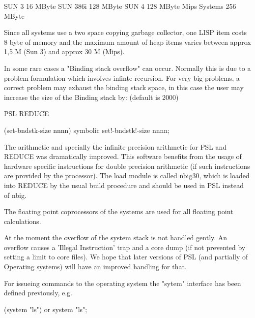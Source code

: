 \begin{enumerate}
{




         SUN 3               16 MByte
         SUN 386i           128 MByte
         SUN 4              128 MByte 
         Mips Systems       256 MByte

Since all systems use a two space copying garbage collector, one LISP 
item costs 8 byte of memory and the maximum amount of heap items varies 
between approx 1,5 M (Sun 3) and approx 30 M (Mips).   


In some rare cases a "Binding stack overflow" can occur. 
Normally this is due to a problem formulation which involves infinte
recursion. For very big problems, a correct problem may exhaust the binding
stack space, in this case the user may increase the size of the 
Binding stack by: (default is 2000)

        PSL                               REDUCE
 
   (set-bndstk-size nnnn)       symbolic set!-bndstk!-size nnnn;
 


The arithmetic and specially the infinite precision arithmetic for PSL
and REDUCE was dramatically improved. This software benefits from the
usage of hardware specific instructions for double precision arithmetic
(if such instructions are provided by the processor).
The load module is called nbig30, which is loaded into REDUCE by the 
usual build procedure and should be used in PSL instead of nbig.
  
The floating point coprocessors of the systems are used for all
floating point calculations. 



At the moment the overflow of the system stack is not handled gently.
An overflow causes a 'Illegal Instruction' trap and a core dump (if
not prevented by setting a limit to core files). We hope that later
versions of PSL (and partially of Operating systems) 
will have an improved handling for that.


For issueing commands to the operating system the "sytem" interface
has been defined previously, e.g.


   (system "ls")              or              system "ls";


}
\end{enumerate}
